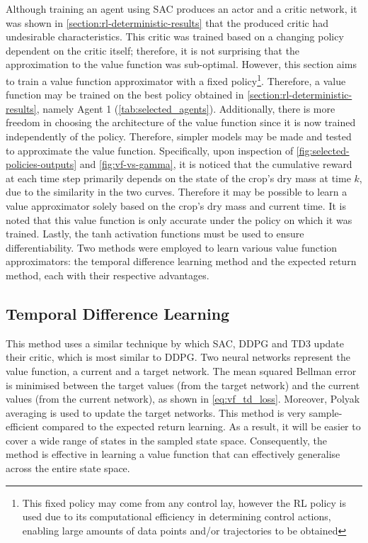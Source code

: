 Although training an agent using SAC produces an actor and a critic network, it was shown in \autoref{section:rl-deterministic-results} that the produced critic had undesirable characteristics. This critic was trained based on a changing policy dependent on the critic itself; therefore, it is not surprising that the approximation to the value function was sub-optimal. However, this section aims to train a value function approximator with a fixed policy\footnote{This fixed policy may come from any control lay, however the RL policy is used due to its computational efficiency in determining control actions, enabling large amounts of data points and/or trajectories to be obtained}. Therefore, a value function may be trained on the best policy obtained in \autoref{section:rl-deterministic-results}, namely Agent 1 (\autoref{tab:selected_agents}). Additionally, there is more freedom in choosing the architecture of the value function since it is now trained independently of the policy. Therefore, simpler models may be made and tested to approximate the value function. Specifically, upon inspection of \autoref{fig:selected-policies-outputs} and \autoref{fig:vf-vs-gamma}, it is noticed that the cumulative reward at each time step primarily depends on the state of the crop’s dry mass at time $k$, due to the similarity in the two curves. Therefore it may be possible to learn a value approximator solely based on the crop’s dry mass and current time. It is noted that this value function is only accurate under the policy on which it was trained. Lastly, the tanh activation functions must be used to ensure differentiability. Two methods were employed to learn various value function approximators: the temporal difference learning method and the expected return method, each with their respective advantages.


\subsection{Temporal Difference Learning}
\label{ssection:td-learning}

This method uses a similar technique by which SAC, DDPG and TD3 update their critic, which is most similar to DDPG. Two neural networks represent the value function, a current and a target network. The mean squared Bellman error is minimised between the target values (from the target network) and the current values (from the current network), as shown in \autoref{eq:vf_td_loss}. Moreover, Polyak averaging is used to update the target networks. This method is very sample-efficient compared to the expected return learning. As a result, it will be easier to cover a wide range of states in the sampled state space. Consequently, the method is effective in learning a value function that can effectively generalise across the entire state space. 

